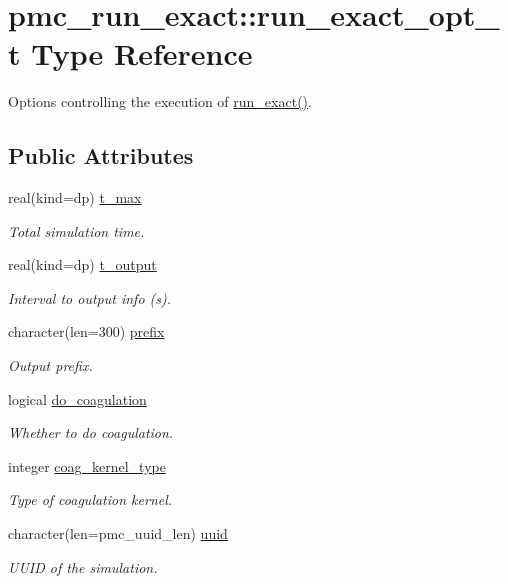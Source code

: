 \hypertarget{structpmc__run__exact_1_1run__exact__opt__t}{}\section{pmc\+\_\+run\+\_\+exact\+:\+:run\+\_\+exact\+\_\+opt\+\_\+t Type Reference}
\label{structpmc__run__exact_1_1run__exact__opt__t}


Options controlling the execution of \mbox{\hyperlink{namespacepmc__run__exact_a8db86b29e1aee6d3aa9f2e922dd1eb97}{run\+\_\+exact()}}.  


\subsection*{Public Attributes}
\begin{DoxyCompactItemize}
\item 
real(kind=dp) \mbox{\hyperlink{structpmc__run__exact_1_1run__exact__opt__t_ab2b67c8ea335e0fe8de12f9c3f43ec89}{t\+\_\+max}}
\begin{DoxyCompactList}\small\item\em Total simulation time. \end{DoxyCompactList}\item 
real(kind=dp) \mbox{\hyperlink{structpmc__run__exact_1_1run__exact__opt__t_a002de94b2904f63371d1f615dd348107}{t\+\_\+output}}
\begin{DoxyCompactList}\small\item\em Interval to output info (s). \end{DoxyCompactList}\item 
character(len=300) \mbox{\hyperlink{structpmc__run__exact_1_1run__exact__opt__t_a75c70a107653f5097a936a5cd456aa6f}{prefix}}
\begin{DoxyCompactList}\small\item\em Output prefix. \end{DoxyCompactList}\item 
logical \mbox{\hyperlink{structpmc__run__exact_1_1run__exact__opt__t_ae3fc2cb1aa32dc33cc3efbd89de2dd93}{do\+\_\+coagulation}}
\begin{DoxyCompactList}\small\item\em Whether to do coagulation. \end{DoxyCompactList}\item 
integer \mbox{\hyperlink{structpmc__run__exact_1_1run__exact__opt__t_aa9c67c849c24ab01c630f60270545c08}{coag\+\_\+kernel\+\_\+type}}
\begin{DoxyCompactList}\small\item\em Type of coagulation kernel. \end{DoxyCompactList}\item 
character(len=pmc\+\_\+uuid\+\_\+len) \mbox{\hyperlink{structpmc__run__exact_1_1run__exact__opt__t_a3341ca1feb0b0256620c471848fc7ec1}{uuid}}
\begin{DoxyCompactList}\small\item\em U\+U\+ID of the simulation. \end{DoxyCompactList}\end{DoxyCompactItemize}


